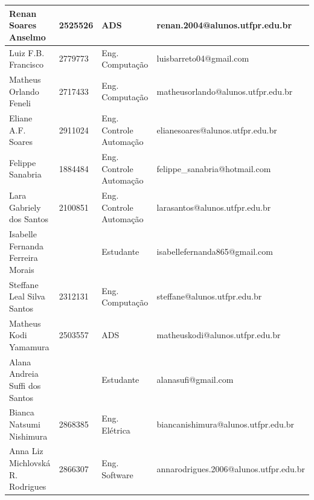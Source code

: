 \documentclass[12pt, a4paper]{article}
\begin{document}
\begin{table}[htbp]
{\begin{tabular}{|l|l|l|l|}
Renan Soares Anselmo                               & 2525526                                         & ADS                                                & renan.2004@alunos.utfpr.edu.br                     \\ \hline
Luiz F.B. Francisco                                & 2779773                                         & Eng. Computação                                    & luisbarreto04@gmail.com                            \\ \hline
Matheus Orlando Feneli                             & 2717433                                         & Eng. Computação                                    & matheusorlando@alunos.utfpr.edu.br                 \\ \hline
Eliane A.F. Soares                                 & 2911024                                         & Eng. Controle Automação                            & elianesoares@alunos.utfpr.edu.br                   \\ \hline
Felippe Sanabria                                   & 1884484                                         & Eng. Controle Automação                            & felippe\_sanabria@hotmail.com                      \\ \hline
Lara Gabriely dos Santos                           & 2100851                                         & Eng. Controle Automação                            & larasantos@alunos.utfpr.edu.br                     \\ \hline
Isabelle Fernanda Ferreira Morais &&Estudante&isabellefernanda865@gmail.com\\ \hline
Steffane Leal Silva Santos                         & 2312131                                         & Eng. Computação                                    & steffane@alunos.utfpr.edu.br                       \\ \hline
Matheus Kodi Yamamura                              & 2503557                                         & ADS                                                & matheuskodi@alunos.utfpr.edu.br                    \\ \hline
Alana Andreia Suffi dos Santos&&Estudante&alanasufi@gmail.com\\ \hline
Bianca Natsumi Nishimura                           & 2868385                                         & Eng. Elétrica                                      & biancanishimura@alunos.utfpr.edu.br                \\ \hline
Anna Liz Michlovská R. Rodrigues                   & 2866307                                         & Eng. Software                                      & annarodrigues.2006@alunos.utfpr.edu.br             \\ \hline

\end{tabular}}
\end{table}
\end{document}

